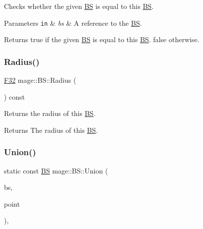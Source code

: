Checks whether the given \hyperlink{classmage_1_1_b_s}{BS} is equal to this \hyperlink{classmage_1_1_b_s}{BS}.


\begin{DoxyParams}[1]{Parameters}
\mbox{\tt in}  & {\em bs} & A reference to the \hyperlink{classmage_1_1_b_s}{BS}. \\
\hline
\end{DoxyParams}
\begin{DoxyReturn}{Returns}
{\ttfamily true} if the given \hyperlink{classmage_1_1_b_s}{BS} is equal to this \hyperlink{classmage_1_1_b_s}{BS}. {\ttfamily false} otherwise. 
\end{DoxyReturn}
\hypertarget{classmage_1_1_b_s_a2814e5d5ad569bfcbf08f368cd23dbea}{}\label{classmage_1_1_b_s_a2814e5d5ad569bfcbf08f368cd23dbea} 
\subsubsection{\texorpdfstring{Radius()}{Radius()}}
{\footnotesize\ttfamily \hyperlink{namespacemage_aa97e833b45f06d60a0a9c4fc22ae02c0}{F32} mage\+::\+B\+S\+::\+Radius (\begin{DoxyParamCaption}{ }\end{DoxyParamCaption}) const\hspace{0.3cm}{\ttfamily [noexcept]}}

Returns the radius of this \hyperlink{classmage_1_1_b_s}{BS}.

\begin{DoxyReturn}{Returns}
The radius of this \hyperlink{classmage_1_1_b_s}{BS}. 
\end{DoxyReturn}
\hypertarget{classmage_1_1_b_s_a7b96b2f5aad48af6f59c45e4bbb4a1af}{}\label{classmage_1_1_b_s_a7b96b2f5aad48af6f59c45e4bbb4a1af} 
\subsubsection{\texorpdfstring{Union()}{Union()}\hspace{0.1cm}{\footnotesize\ttfamily [1/3]}}
{\footnotesize\ttfamily static const \hyperlink{classmage_1_1_b_s}{BS} mage\+::\+B\+S\+::\+Union (\begin{DoxyParamCaption}\item[{const \hyperlink{classmage_1_1_b_s}{BS} \&}]{bs,  }\item[{const \hyperlink{structmage_1_1_point3}{Point3} \&}]{point }\end{DoxyParamCaption})\hspace{0.3cm}{\ttfamily [static]}, {\ttfamily [noexcept]}}

